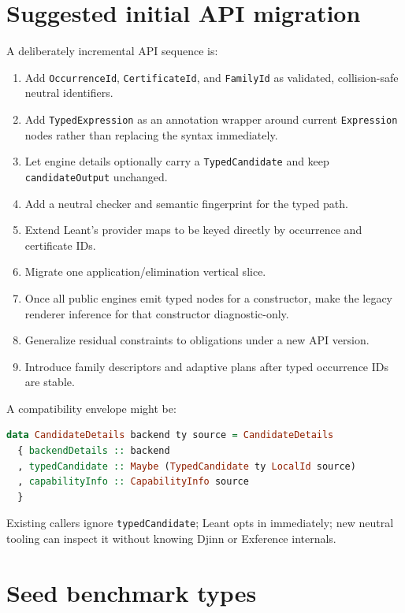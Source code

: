 \documentclass[11pt]{article}
\newcommand{\code}[1]{\texttt{#1}}
\newcommand{\Leant}{\textsf{Leant}}
\newcommand{\Djinn}{Djinn}
\newcommand{\Exference}{Exference}
\begin{document}
\section{Suggested initial API migration}
\label{app:api}

A deliberately incremental API sequence is:

\begin{enumerate}
  \item Add \code{OccurrenceId}, \code{CertificateId}, and \code{FamilyId} as
    validated, collision-safe neutral identifiers.
  \item Add \code{TypedExpression} as an annotation wrapper around current
    \code{Expression} nodes rather than replacing the syntax immediately.
  \item Let engine details optionally carry a \code{TypedCandidate} and keep
    \code{candidateOutput} unchanged.
  \item Add a neutral checker and semantic fingerprint for the typed path.
  \item Extend \Leant{}'s provider maps to be keyed directly by occurrence and
    certificate IDs.
  \item Migrate one application/elimination vertical slice.
  \item Once all public engines emit typed nodes for a constructor, make the
    legacy renderer inference for that constructor diagnostic-only.
  \item Generalize residual constraints to obligations under a new API version.
  \item Introduce family descriptors and adaptive plans after typed occurrence
    IDs are stable.
\end{enumerate}

A compatibility envelope might be:

\begin{lstlisting}[language=Haskell]
data CandidateDetails backend ty source = CandidateDetails
  { backendDetails :: backend
  , typedCandidate :: Maybe (TypedCandidate ty LocalId source)
  , capabilityInfo :: CapabilityInfo source
  }
\end{lstlisting}

Existing callers ignore \code{typedCandidate}; \Leant{} opts in immediately;
new neutral tooling can inspect it without knowing \Djinn{} or \Exference{}
internals.

\section{Seed benchmark types}
\label{app:benchmarks}
\end{document}
